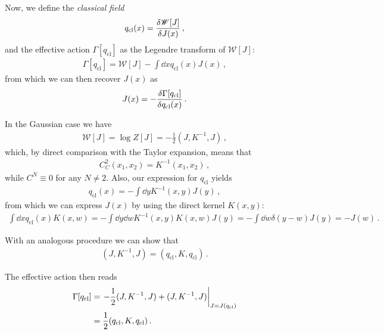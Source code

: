 \documentclass[main.tex]{subfiles}
\begin{document}
Now, we define the \emph{classical field}
%
\begin{align}
q _{\text{cl}}(x) = \fdv{\mathscr{W}[J]}{J(x)}
\,,
\end{align}
%
and the effective action \(\Gamma [q _{\text{cl}}]\) as the Legendre transform of \(\mathscr{W}[J]\): 
%
\begin{align}
\Gamma [q _{\text{cl}}] = \mathscr{W}[J] - \int \dd{x} q _{\text{cl}} (x) J(x) 
\,,
\end{align}
%
from which we can then recover \(J(x)\) as 
%
\begin{align}
J(x) = - \fdv{\Gamma [q _{\text{cl}}]}{q _{\text{cl}}(x)}
\,.
\end{align}

In the Gaussian case we have 
%
\begin{align}
\mathscr{W}[J] = \log Z[J] = - \frac{1}{2} (J, K^{-1}, J)  
\,,
\end{align}
%
which, by direct comparison with the Taylor expansion, means that 
%
\begin{align}
C^{2}_{C} (x_1 , x_2 ) = K^{-1} (x_1 , x_2 )
\,,
\end{align}
%
while \(C^{N} \equiv 0\) for any \(N \neq 2\). 
Also, our expression for \(q _{\text{cl}}\) yields 
%
\begin{align}
q _{\text{cl}}(x) = -\int \dd{y} K^{-1}(x, y) J(y) 
\,,
\end{align}
%
from which we can express \(J(x)\) by using the direct kernel \(K(x, y)\): 
%
\begin{align}
\int \dd{x} q _{\text{cl}} (x) K (x, w) = - \int \dd{y} \dd{w} K^{-1}(x, y) K(x, w) J(y) = - \int \dd{w} \delta (y- w) J(y) = - J(w)
\,.
\end{align}

With an analogous procedure we can show that
%
\begin{align}
(J, K^{-1}, J) = (q _{\text{cl}}, K, q _{\text{cl}})
\,.
\end{align}


The effective action then reads
%
\begin{align}
\Gamma [q _{\text{cl}}] &= \eval{- \frac{1}{2} (J, K^{-1}, J) + (J, K^{-1}, J)}_{J = J(q _{\text{cl}})} \\
&= \frac{1}{2} (q _{\text{cl}}, K, q _{\text{cl}})
\,.
\end{align}
\end{document}
